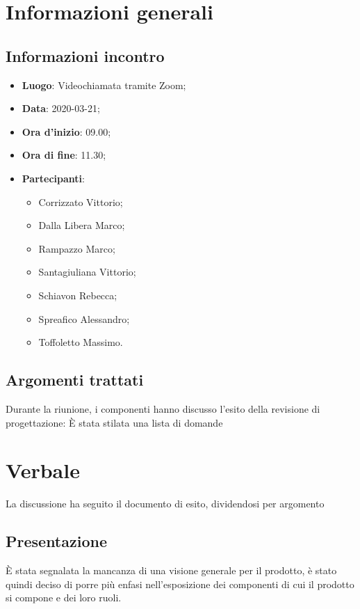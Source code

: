 \section{Informazioni generali}
    \subsection{Informazioni incontro}
        \begin{itemize}
            \item \textbf{Luogo}: Videochiamata tramite Zoom;
            \item \textbf{Data}: 2020-03-21;
            \item \textbf{Ora d'inizio}: 09.00;
            \item \textbf{Ora di fine}: 11.30;
            \item \textbf{Partecipanti}: \begin{itemize}
                \item Corrizzato Vittorio;
                \item Dalla Libera Marco;
                \item Rampazzo Marco;
                \item Santagiuliana Vittorio;
                \item Schiavon Rebecca;
                \item Spreafico Alessandro;
                \item Toffoletto Massimo.
            \end{itemize}
        \end{itemize}
    \subsection{Argomenti trattati}
        Durante la riunione, i componenti hanno discusso l'esito della revisione di progettazione:
        È stata stilata una lista di domande 
\section{Verbale}
    La discussione ha seguito il documento di esito, dividendosi per argomento
    \subsection{Presentazione}
        È stata segnalata la mancanza di una visione generale per il prodotto, è stato quindi deciso di porre più enfasi nell'esposizione dei componenti di cui il prodotto si compone e dei loro ruoli.
